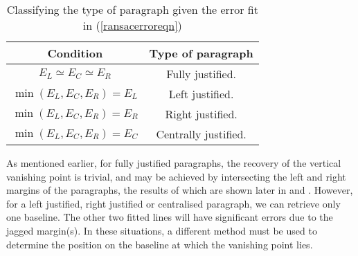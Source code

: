 \begin{table}[t]
  \begin{center}
    \begin{tabular}{|c|c|}
      \hline
      {\bf Condition} & {\bf Type of paragraph} \\
      \hline \hline
      $E_L \simeq E_C \simeq E_R$ & Fully justified. \\
      \hline
      $\min(E_L,E_C,E_R)=E_L$ & Left justified. \\
      \hline
      $\min(E_L,E_C,E_R)=E_R$ & Right justified. \\
      \hline
      $\min(E_L,E_C,E_R)=E_C$ & Centrally justified. \\
      \hline
    \end{tabular}
  \end{center}
  \caption{Classifying the type of paragraph given the error fit in (\ref{ransacerroreqn})}
  \label{typeofparatable}
\end{table}



As mentioned earlier, for fully justified paragraphs, the recovery of the
vertical vanishing point is trivial, and may be achieved by intersecting the
left and right margins of the paragraphs, the results of which are shown later
in  and . 
However, for a left justified, right justified or centralised paragraph, we can
retrieve only one baseline.  The other two fitted lines will have significant
errors due to the jagged margin(s).  In these situations, a different method
must be used to determine the position on the baseline at which the vanishing
point lies.






